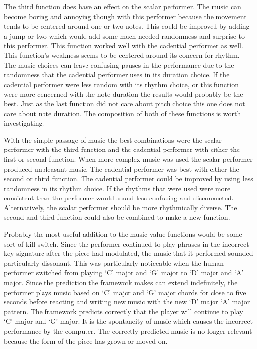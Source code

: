 \documentclass[12pt]{ucthesis}
\begin{document}
The third function does have an effect on the scalar performer. The music can become boring and annoying though with this performer because the movement tends to be centered around one or two notes. This could be improved by adding a jump or two which would add some much needed randomness and surprise to this performer. This function worked well with the cadential performer as well. This function's weakness seems to be centered around its concern for rhythm. The music choices can leave confusing pauses in the performance due to the randomness that the cadential performer uses in its duration choice. If the cadential performer were less random with its rhythm choice, or this function were more concerned with the note duration the results would probably be the best. Just as the last function did not care about pitch choice this one does not care about note duration. The composition of both of these functions is worth investigating. 

With the simple passage of music the best combinations were the scalar performer with the third function and the cadential performer with either the first or second function. When more complex music was used the scalar performer produced unpleasant music. The cadential performer was best with either the second or third function. The cadential performer could be improved by using less randomness in its rhythm choice. If the rhythms that were used were more consistent than the performer would sound less confusing and disconnected. Alternatively, the scalar performer should be more rhythmically diverse. The second and third function could also be combined to make a new function. 

Probably the most useful addition to the music value functions would be some sort of kill switch.  Since the performer continued to play phrases in the incorrect key signature after the piece had modulated, the music that it performed sounded particularly dissonant. This was particularly noticeable when the human performer switched from playing `C' major and `G' major to `D' major and `A' major. Since the prediction the framework makes can extend indefinitely, the performer plays music based on `C' major and `G' major chords for close to five seconds before reacting and writing new music with the new `D' major `A' major pattern. The framework predicts correctly that the player will continue to play `C' major and `G' major. It is the spontaneity of music which causes the incorrect performance by the computer. The correctly predicted music is no longer relevant because the form of the piece has grown or moved on. 
\end{document}
